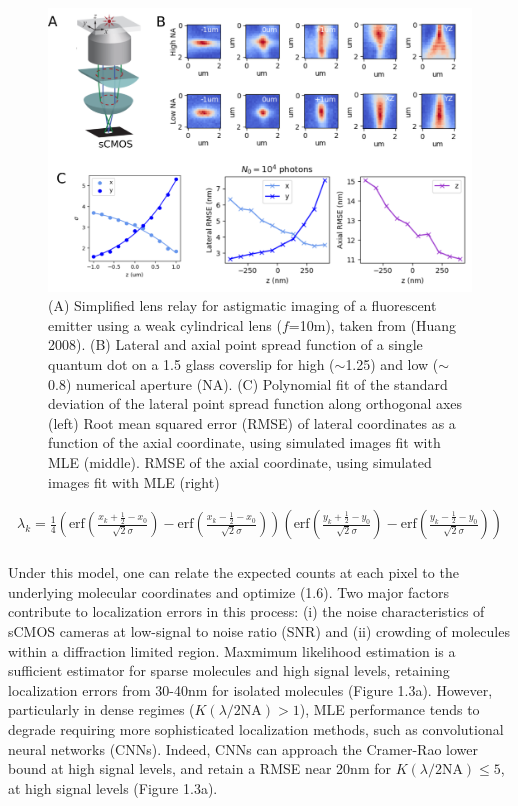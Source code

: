 \documentclass{ucetd}
\begin{document}
\clearpage
\begin{figure}
\begin{center}
\includegraphics[width=16cm]{Astigmatism.png}
\end{center}
\caption{(A) Simplified lens relay for astigmatic imaging of a fluorescent emitter using a weak cylindrical lens ($f$=10m), taken from (Huang 2008). (B) Lateral and axial point spread function of a single quantum dot on a 1.5 glass coverslip for high ($\sim$1.25) and low ($\sim$0.8) numerical aperture (NA). (C) Polynomial fit of the standard deviation of the lateral point spread function along orthogonal axes (left) Root mean squared error (RMSE) of lateral coordinates as a function of the axial coordinate, using simulated images fit with MLE (middle). RMSE of the axial coordinate, using simulated images fit with MLE (right)}
\end{figure}


\begin{align*}
\lambda_{k} = \frac{1}{4}\left(\mathrm{erf}\left(\frac{x_{k}+\frac{1}{2}-x_{0}}{\sqrt{2}\sigma}\right) -\mathrm{erf}\left(\frac{x_{k}-\frac{1}{2}-x_{0}}{\sqrt{2}\sigma}\right)\right)\left(\mathrm{erf}\left(\frac{y_{k}+\frac{1}{2}-y_{0}}{\sqrt{2}\sigma}\right) -\mathrm{erf}\left(\frac{y_{k}-\frac{1}{2}-y_{0}}{\sqrt{2}\sigma}\right)\right)\\
\end{align*}


Under this model, one can relate the expected counts at each pixel to the underlying molecular coordinates and optimize (1.6). Two major factors contribute to localization errors in this process: (i) the noise characteristics of sCMOS cameras at low-signal to noise ratio (SNR) and (ii) crowding of molecules within a diffraction limited region. Maxmimum likelihood estimation is a sufficient estimator for sparse molecules and high signal levels, retaining localization errors from 30-40nm for isolated molecules (Figure 1.3a). However, particularly in dense regimes ($K(\lambda/2\mathrm{NA}) > 1$), MLE performance tends to degrade requiring more sophisticated localization methods, such as convolutional neural networks (CNNs). Indeed, CNNs can approach the Cramer-Rao lower bound at high signal levels, and retain a RMSE near 20nm for $K(\lambda/2\mathrm{NA}) \leq 5$, at high signal levels (Figure 1.3a). 
\end{document}
